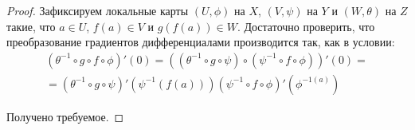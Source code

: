 \begin{proof}
	Зафиксируем локальные карты $(U, \phi)$ на $X$, $(V, \psi)$ на $Y$ и $(W, \theta)$ на $Z$ такие, что $a \in U$, $f(a) \in V$ и $g(f(a)) \in W$. Достаточно проверить, что преобразование градиентов дифференциалами производится так, как в условии:
	\begin{multline*}
		(\theta^{-1}\circ g \circ f \circ \phi)'(0) = \left((\theta^{-1}\circ g \circ \psi) \circ (\psi^{-1} \circ f \circ \phi)\right)'(0) = \\
		=(\theta^{-1}\circ g \circ \psi)'\left(\psi^{-1}(f(a))\right)(\psi^{-1} \circ f \circ \phi)'(\phi^{-1(a)})
	\end{multline*}
	
	Получено требуемое.
\end{proof}